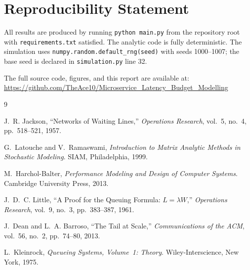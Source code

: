 \documentclass[12pt,a4paper]{article}
\begin{document}
\section*{Reproducibility Statement}

All results are produced by running \texttt{python main.py} from the repository root
with \texttt{requirements.txt} satisfied. The analytic code is fully deterministic.
The simulation uses \texttt{numpy.random.default\_rng(seed)} with seeds 1000--1007;
the base seed is declared in \texttt{simulation.py} line 32.

The full source code, figures, and this report are available at:\\
\url{https://github.com/TheAce10/Microservice\_Latency\_Budget\_Modelling}


\begin{thebibliography}{9}

J.~R. Jackson,
``Networks of Waiting Lines,''
\textit{Operations Research}, vol.~5, no.~4, pp.~518--521, 1957.

G.~Latouche and V.~Ramaswami,
\textit{Introduction to Matrix Analytic Methods in Stochastic Modeling}.
SIAM, Philadelphia, 1999.

M.~Harchol-Balter,
\textit{Performance Modeling and Design of Computer Systems}.
Cambridge University Press, 2013.

J.~D.~C. Little,
``A Proof for the Queuing Formula: $L = \lambda W$,''
\textit{Operations Research}, vol.~9, no.~3, pp.~383--387, 1961.

J.~Dean and L.~A. Barroso,
``The Tail at Scale,''
\textit{Communications of the ACM}, vol.~56, no.~2, pp.~74--80, 2013.

L.~Kleinrock,
\textit{Queueing Systems, Volume~1: Theory}.
Wiley-Interscience, New York, 1975.

\end{thebibliography}
\end{document}
